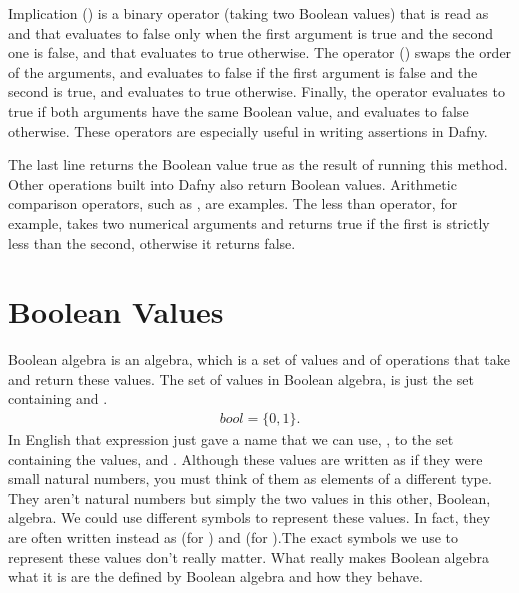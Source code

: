 \documentclass[letterpaper,10pt,english]{sphinxmanual}
\begin{document}
Implication (\sphinxstyleemphasis{==\textgreater{}}) is a binary operator (taking two Boolean values)
that is read as  and that evaluates to false only when the
first argument is true and the second one is false, and that evaluates
to true otherwise. The  operator (\sphinxstyleemphasis{\textless{}==}) swaps the order of
the arguments, and evaluates to false if the first argument is false
and the second is true, and evaluates to true otherwise. Finally, the
 operator evaluates to true if both arguments have the
same Boolean value, and evaluates to false otherwise. These operators
are especially useful in writing assertions in Dafny.

The last line returns the Boolean value true as the result of running
this method. Other operations built into Dafny also return Boolean
values.  Arithmetic comparison operators, such as \sphinxstyleemphasis{\textless{}}, are examples.
The less than operator, for example, takes two numerical arguments and
returns true if the first is strictly less than the second, otherwise
it returns false.


\section{Boolean Values}
\label{\detokenize{09-boolean-algebra:boolean-values}}
Boolean algebra is an algebra, which is a set of values and of
operations that take and return these values. The set of values in
Boolean algebra, is just the set containing  and .
\begin{equation*}
\begin{split}bool = \{ 0, 1 \}.\end{split}
\end{equation*}
In English that expression just gave a name that we can use, ,
to the set containing the values,  and . Although these values
are written as if they were small natural numbers, you must think of
them as elements of a different type. They aren’t natural numbers but
simply the two values in this other, Boolean, algebra. We could use
different symbols to represent these values. In fact, they are often
written instead as  (for ) and  (for ).The exact
symbols we use to represent these values don’t really matter. What
really makes Boolean algebra what it is are the  defined
by Boolean algebra and how they behave.
\end{document}
